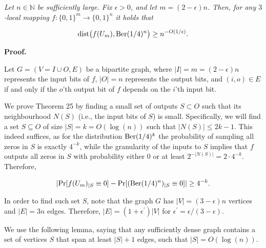 \emph{Let $n\in\mathbb{N}$ be sufficiently large.
Fix $\epsilon>0$, and let $m=(2-\epsilon)n$.
Then, for any $3$-local mapping $f\colon\{0,1\}^{m}\to\{0,1\}^{n}$ it holds that}\par


\[\begin{gathered}
\mathrm{dist}\bigl(f(U_{m}),\textnormal{Ber}(1/4)^{n}\bigr)\geq n^{-O(1/\epsilon)}.
\end{gathered}\]






\par\medskip\noindent\textbf{Proof.}\par




Let $G=(V=I\cup O,E)$ be a bipartite graph, where $|I|=m=(2-\epsilon)n$ represents the input bits of $f$, $|O|=n$ represents the output bits, and $(i,o)\in E$ if and only if the $o$’th output bit of $f$ depends on the $i$’th input bit.\par




We prove Theorem 25 by finding a small set of outputs $S\subset O$ such that its neighbourhood $N(S)$ (i.e., the input bits of $S$) is small. Specifically, we will find a set $S\subseteq O$ of size $\lvert S\rvert=k=O(\log(n))$ such that $\lvert N(S)\rvert\leq 2k-1$. This indeed suffices, as for the distribution $\textnormal{Ber}(1/4)^{k}$ the probability of sampling all zeros in $S$ is exactly $4^{-k}$, while the granularity of the inputs to $S$ implies that $f$ outputs all zeros in $S$ with probability either 0 or at least $2^{-\lvert N(S)\rvert}=2\cdot 4^{-k}$. Therefore,\par


\[\begin{gathered}
\lvert\Pr[f(U_{m})_{|S}\equiv 0]-\Pr[(\textnormal{Ber}(1/4)^{n})_{|S}\equiv 0]\rvert\geq 4^{-k}.
\end{gathered}\]




In order to find such set $S$, note that the graph $G$ has $\lvert V\rvert=(3-\epsilon)n$ vertices and $\lvert E\rvert=3n$ edges. Therefore, $\lvert E\rvert=(1+\epsilon^{\prime})\lvert V\rvert$ for $\epsilon^{\prime}=\epsilon/(3-\epsilon)$.\par




We use the following lemma, saying that any sufficiently dense graph contains a set of vertices $S$ that span at least $|S|+1$ edges, such that $|S|=O(\log(n))$.\par




